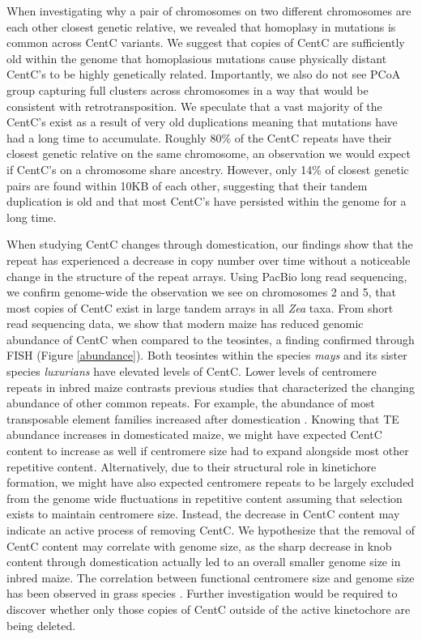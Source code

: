 When investigating why a pair of chromosomes on two different chromosomes are each other closest genetic relative, we revealed that homoplasy in mutations is common across CentC variants.  We suggest that copies of CentC are sufficiently old within the genome that homoplasious mutations cause physically distant CentC’s to be highly genetically related.  Importantly, we also do not see PCoA group capturing full clusters across chromosomes in a way that would be consistent with retrotransposition. We speculate that a vast majority of the CentC’s exist as a result of very old duplications meaning that mutations have had a long time to accumulate. Roughly 80\% of the CentC repeats have their closest genetic relative on the same chromosome, an observation we would expect if CentC’s on a chromosome share ancestry.  However, only 14\% of closest genetic pairs are found within 10KB of each other, suggesting that their tandem duplication is old and that most CentC’s have persisted within the genome for a long time. 

When studying CentC changes through domestication, our findings show that the repeat has experienced a decrease in copy number over time without a noticeable change in the structure of the repeat arrays. Using PacBio long read sequencing, we confirm genome-wide the observation we see on chromosomes 2 and 5, that most copies of CentC exist in large tandem arrays in all \emph{Zea} taxa.  From short read sequencing data, we show that modern maize has reduced genomic abundance of CentC when compared to the teosintes, a finding confirmed through FISH (Figure \ref{abundance}).  Both teosintes within the species \emph{mays} and its sister species \emph{luxurians} have elevated levels of CentC.  Lower levels of centromere repeats in inbred maize contrasts previous studies that characterized the changing abundance of other common repeats.  For example, the abundance of most transposable element families increased after domestication \citep{Chia2012}.  Knowing that TE abundance increases in domesticated maize, we might have expected CentC content to increase as well if centromere size had to expand alongside most other repetitive content.  Alternatively, due to their structural role in kinetichore formation, we might have also expected centromere repeats to be largely excluded from the genome wide fluctuations in repetitive content assuming that selection exists to maintain centromere size.  Instead, the decrease in CentC content may indicate an active process of removing CentC.  We hypothesize that the removal of CentC content may correlate with genome size, as the sharp decrease in knob content through domestication actually led to an overall smaller genome size in inbred maize. The correlation between  functional  centromere size and genome size has been observed in grass species \citep{Zhang2012}.  Further investigation would be required to discover whether only those copies of CentC outside of the active kinetochore are being deleted.

